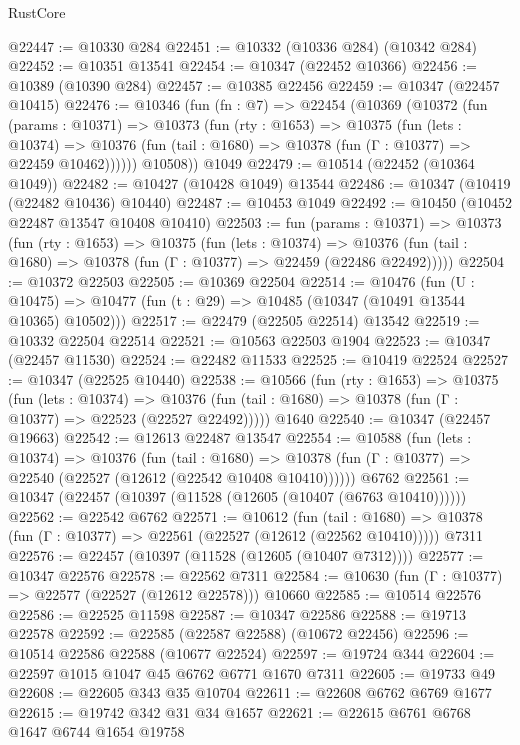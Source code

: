 \begin{lexlean}{RustCore}
\begin{coremodule}
@22447 := @10330 @284
@22451 := @10332 (@10336 @284) (@10342 @284)
@22452 := @10351 @13541
@22454 := @10347 (@22452 @10366)
@22456 := @10389 (@10390 @284)
@22457 := @10385 @22456
@22459 := @10347 (@22457 @10415)
@22476 := @10346
    (fun (fn : @7) =>
    @22454
      (@10369
        (@10372
          (fun (params : @10371) =>
          @10373
            (fun (rty : @1653) =>
            @10375
              (fun (lets : @10374) =>
              @10376 (fun (tail : @1680) => @10378 (fun (Γ : @10377) => @22459 @10462))))))
        @10508))
    @1049
@22479 := @10514 (@22452 (@10364 @1049))
@22482 := @10427 (@10428 @1049) @13544
@22486 := @10347 (@10419 (@22482 @10436) @10440)
@22487 := @10453 @1049
@22492 := @10450 (@10452 @22487 @13547 @10408 @10410)
@22503 := fun (params : @10371) =>
  @10373
    (fun (rty : @1653) =>
    @10375
      (fun (lets : @10374) =>
      @10376 (fun (tail : @1680) => @10378 (fun (Γ : @10377) => @22459 (@22486 @22492)))))
@22504 := @10372 @22503
@22505 := @10369 @22504
@22514 := @10476
    (fun (U : @10475) => @10477 (fun (t : @29) => @10485 (@10347 (@10491 @13544 @10365) @10502)))
@22517 := @22479 (@22505 @22514) @13542
@22519 := @10332 @22504 @22514
@22521 := @10563 @22503 @1904
@22523 := @10347 (@22457 @11530)
@22524 := @22482 @11533
@22525 := @10419 @22524
@22527 := @10347 (@22525 @10440)
@22538 := @10566
    (fun (rty : @1653) =>
    @10375
      (fun (lets : @10374) =>
      @10376 (fun (tail : @1680) => @10378 (fun (Γ : @10377) => @22523 (@22527 @22492)))))
    @1640
@22540 := @10347 (@22457 @19663)
@22542 := @12613 @22487 @13547
@22554 := @10588
    (fun (lets : @10374) =>
    @10376
      (fun (tail : @1680) =>
      @10378 (fun (Γ : @10377) => @22540 (@22527 (@12612 (@22542 @10408 @10410))))))
    @6762
@22561 := @10347 (@22457 (@10397 (@11528 (@12605 (@10407 (@6763 @10410))))))
@22562 := @22542 @6762
@22571 := @10612
    (fun (tail : @1680) => @10378 (fun (Γ : @10377) => @22561 (@22527 (@12612 (@22562 @10410)))))
    @7311
@22576 := @22457 (@10397 (@11528 (@12605 (@10407 @7312))))
@22577 := @10347 @22576
@22578 := @22562 @7311
@22584 := @10630 (fun (Γ : @10377) => @22577 (@22527 (@12612 @22578))) @10660
@22585 := @10514 @22576
@22586 := @22525 @11598
@22587 := @10347 @22586
@22588 := @19713 @22578
@22592 := @22585 (@22587 @22588) (@10672 @22456)
@22596 := @10514 @22586 @22588 (@10677 @22524)
@22597 := @19724 @344
@22604 := @22597 @1015 @1047 @45 @6762 @6771 @1670 @7311
@22605 := @19733 @49
@22608 := @22605 @343 @35 @10704
@22611 := @22608 @6762 @6769 @1677
@22615 := @19742 @342 @31 @34 @1657
@22621 := @22615 @6761 @6768 @1647 @6744 @1654 @19758

\end{coremodule}
\end{lexlean}
